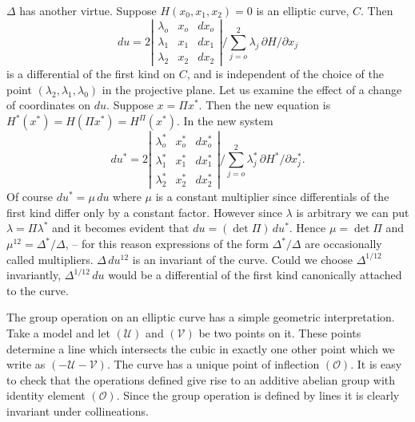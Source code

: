 $\Delta$ has another virtue. Suppose $H(x_{0},x_{1},x_{2})=0$ is an
elliptic curve, $C$. Then
\[
du=2\left|\begin{array}{ccc}
\lambda_{o}&x_{o}&dx_{o}\\
\lambda_{1}&x_{1}&dx_{1}\\
\lambda_{2}&x_{2}&dx_{2}
\end{array}\right|
\Bigg/\sum_{j=o}^{2}\lambda_{j}\,\partial H/\partial x_{j}
\]
is a differential of the first kind on $C$, and is independent of the
choice of the point $(\lambda_{2},\lambda_{1},\lambda_{0})$ in the
projective plane. Let us examine the effect of a change of coordinates on
$du$. Suppose $x=\Pi x^{*}$. Then the new equation is
$H^{*}(x^{*})=H(\Pi x^{*})=H^{\Pi}(x^{*})$. In the new system
\[
du^{*}=2\left|\begin{array}{ccc}
\lambda_{o}^{*}&x_{o}^{*}&dx_{o}^{*}\\
\lambda_{1}^{*}&x_{1}^{*}&dx_{1}^{*}\\
\lambda_{2}^{*}&x_{2}^{*}&dx_{2}^{*}
\end{array}\right|
\Bigg/\sum_{j=o}^{2}\lambda_{j}^{*}\,\partial H^{*}/\partial x_{j}^{*}.
\]
Of course $du^{*}=\mu\,du$ where $\mu$ is a constant multiplier since
differentials of the first kind differ only by a constant factor. However
since $\lambda$ is arbitrary we can put $\lambda=\Pi\lambda^{*}$ and it
becomes evident that $du=(\det\Pi)\,du^{*}$. Hence $\mu=\det\Pi$ and
$\mu^{12}=\Delta^{*}/\Delta$, -- for this reason expressions of the form
$\Delta^{*}/\Delta$ are occasionally called multipliers.
$\Delta\,du^{12}$ is an invariant of the curve. Could we choose
$\Delta^{1/12}$ invariantly, $\Delta^{1/12}\,du$ would be a differential
of the first kind canonically attached to the curve.

The group operation on an elliptic curve has a simple geometric
interpretation. Take a model and let $(\mathcal{U})$ and $(\mathcal{V})$
be two points on it. These points determine a line which intersects the
cubic in exactly one other point which we write as
$(-\mathcal{U}-\mathcal{V})$. The curve has a unique point of inflection
$(\mathcal{O})$. It is easy to check that the operations defined give
rise to an additive abelian group with identity element
$(\mathcal{O})$. Since the group operation is defined by lines it is
clearly invariant under collineations.

